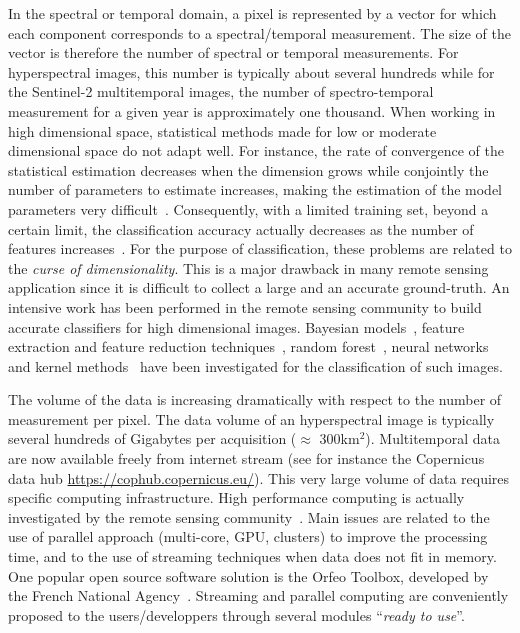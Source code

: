 \documentclass[journal]{IEEEtran}
\begin{document}
In the spectral or temporal domain, a pixel is represented by a vector
for   which  each   component  corresponds   to  a   spectral/temporal
measurement.   The size  of  the  vector is  therefore  the number  of
spectral  or temporal  measurements.  For  hyperspectral images,  this
number is  typically about several  hundreds while for  the Sentinel-2
multitemporal images, the number of spectro-temporal measurement for a
given  year  is approximately  one  thousand.   When working  in  high
dimensional  space,  statistical  methods  made for  low  or  moderate
dimensional  space do  not  adapt  well.  For  instance,  the rate  of
convergence of the statistical estimation decreases when the dimension
grows while conjointly the number of parameters to estimate increases,
making    the    estimation    of   the    model    parameters    very
difficult~\cite{donoho}.  Consequently,  with a limited  training set,
beyond a certain limit, the classification accuracy actually decreases
as the number of features increases~\cite{hughes}.  For the purpose of
classification,  these  problems are  related  to  the \emph{curse  of
  dimensionality}. This  is a  major drawback  in many  remote sensing
application since it  is difficult to collect a large  and an accurate
ground-truth.   An intensive  work has  been performed  in the  remote
sensing community  to build accurate classifiers  for high dimensional
images.  Bayesian models~\cite{book:landgrebe}, feature extraction and
feature   reduction   techniques~\cite{book:landgrebe,DR:guided:tour},
random   forest~\cite{1396322},  neural   networks~\cite{5411821}  and
kernel methods~\cite{kernel:methods:rs} have been investigated for the
classification of such images.

The volume of the data is  increasing dramatically with respect to the
number of measurement  per pixel. The data volume  of an hyperspectral
image  is  typically several  hundreds  of  Gigabytes per  acquisition
($\approx$  300km$^2$). Multitemporal  data are  now available  freely
from  internet  stream  (see  for instance  the  Copernicus  data  hub
\url{https://cophub.copernicus.eu/}).  This very  large volume of data
requires   specific   computing  infrastructure.    High   performance
computing   is   actually   investigated   by   the   remote   sensing
community~\cite{christophe2011remote,plaza2011high}.  Main  issues are
related to the use of parallel approach (multi-core, GPU, clusters) to
improve the  processing time, and  to the use of  streaming techniques
when data  does not fit in  memory.  One popular open  source software
solution  is  the Orfeo  Toolbox,  developed  by the  French  National
Agency~\cite{christophe2008orfeo}.   Streaming and  parallel computing
are  conveniently proposed  to the  users/developpers through  several
modules ``\emph{ready to use}''.
\end{document}
